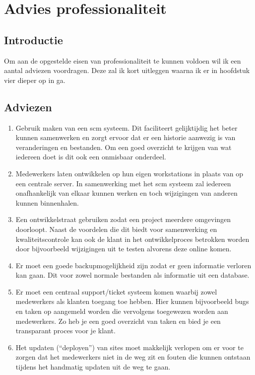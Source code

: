 \chapter{Advies professionaliteit}

\section{Introductie}

Om aan de opgestelde eisen van professionaliteit te kunnen voldoen wil ik een aantal adviezen voordragen. Deze zal ik kort uitleggen waarna ik er in hoofdstuk vier dieper op in ga.

\section{Adviezen}

\begin{enumerate}
  \item Gebruik maken van een {\sc scm} systeem. Dit faciliteert gelijktijdig het beter kunnen samenwerken en zorgt ervoor dat er een historie aanwezig is van veranderingen en bestanden. Om een goed overzicht te krijgen van wat iedereen doet is dit ook een onmisbaar onderdeel.
  \item Medewerkers laten ontwikkelen op hun eigen workstations in plaats van op een centrale server. In samenwerking met het {\sc scm} systeem zal iedereen onafhankelijk van elkaar kunnen werken en toch wijzigingen van anderen kunnen binnenhalen.
  \item Een ontwikkelstraat gebruiken zodat een project meerdere omgevingen doorloopt. Naast de voordelen die dit biedt voor samenwerking en kwaliteitscontrole kan ook de klant in het ontwikkelproces betrokken worden door bijvoorbeeld wijzigingen uit te testen alvorens deze online komen.
  \item Er moet een goede backupmogelijkheid zijn zodat er geen informatie verloren kan gaan. Dit voor zowel normale bestanden als informatie uit een database.
  \item Er moet een centraal support/ticket systeem komen waarbij zowel medewerkers als klanten toegang toe hebben. Hier kunnen bijvoorbeeld bugs en taken op aangemeld worden die vervolgens toegewezen worden aan medewerkers. Zo heb je een goed overzicht van taken en bied je een transparant proces voor je klant.
  \item Het updaten (``deployen'') van sites moet makkelijk verlopen om er voor te zorgen dat het medewerkers niet in de weg zit en fouten die kunnen ontstaan tijdens het handmatig updaten uit de weg te gaan.
  
\end{enumerate}
